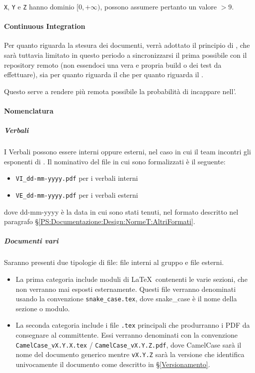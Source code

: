 			\texttt{X}, \texttt{Y} e \texttt{Z} hanno dominio $[0,+\infty)$, possono assumere pertanto un valore $> 9$.

			\paragraph{Continuous Integration}
			Per quanto riguarda la stesura dei documenti, verrà adottato il principio di , che sarà tuttavia limitato in questo periodo
			a sincronizzarsi il prima possibile con il repository remoto (non essendoci
			una vera e propria build o dei test da effettuare), sia per quanto riguarda il  che per quanto riguarda il .

			Questo serve a rendere più remota possibile la probabilità di incappare nell'.


			\paragraph{Nomenclatura}

			\subparagraph{Verbali}	\label{NomenclaturaVerbali}
			I Verbali  possono essere interni oppure esterni, nel caso in cui il team incontri gli esponenti di \II.
			Il nominativo del file in cui sono formalizzati è il seguente:
			\begin{itemize}
				\item \texttt{VI\_dd-mm-yyyy.pdf} per i verbali interni
				\item \texttt{VE\_dd-mm-yyyy.pdf} per i verbali esterni
			\end{itemize}
			dove dd-mm-yyyy è la data in cui sono stati tenuti, nel formato descritto nel paragrafo \S\ref{PS:Documentazione:Design:NormeT:AltriFormati}.

			\subparagraph{Documenti vari}
			Saranno presenti due tipologie di file: file interni al gruppo e file esterni.
			\begin{itemize}
				\item La prima categoria include moduli di \LaTeX\ contenenti le varie sezioni, che non verranno mai esposti esternamente. Questi file verranno
					denominati usando la convenzione \texttt{snake\_case.tex}, dove snake\_case è il nome della sezione o modulo.
				\item La seconda categoria include i file \texttt{.tex} principali che produrranno i PDF da consegnare al committente. Essi verranno denominati
					con la convenzione \texttt{CamelCase\_vX.Y.X.tex} / \texttt{CamelCase\_vX.Y.Z.pdf}, dove CamelCase sarà il nome del documento generico mentre
					\texttt{vX.Y.Z} sarà la versione che identifica univocamente il documento come descritto in \S\ref{Versionamento}.
			\end{itemize}

